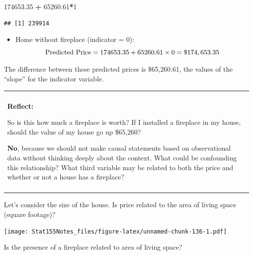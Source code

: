 \documentclass[]{book}
\newenvironment{Shaded}{\begin{snugshade}}{\end{snugshade}}
\newcommand{\DataTypeTok}[1]{\textcolor[rgb]{0.13,0.29,0.53}{#1}}
\newcommand{\DecValTok}[1]{\textcolor[rgb]{0.00,0.00,0.81}{#1}}
\newcommand{\FloatTok}[1]{\textcolor[rgb]{0.00,0.00,0.81}{#1}}
\newcommand{\KeywordTok}[1]{\textcolor[rgb]{0.13,0.29,0.53}{\textbf{#1}}}
\newcommand{\NormalTok}[1]{#1}
\newcommand{\OperatorTok}[1]{\textcolor[rgb]{0.81,0.36,0.00}{\textbf{#1}}}
\newcommand{\StringTok}[1]{\textcolor[rgb]{0.31,0.60,0.02}{#1}}
\providecommand{\tightlist}{%
  \setlength{\itemsep}{0pt}\setlength{\parskip}{0pt}}
\newenvironment{reflect}
{
    \begin{center}
    
    \begin{tabular}{|p{0.8\textwidth}|}
    \rowcolor{LightBlue}
    \hline\\
    \rowcolor{LightBlue}
    \textbf{Reflect:}
}
{
    \\\rowcolor{LightBlue}
    \\\hline
    \end{tabular} 
    \end{center}
}
\begin{document}
\begin{Shaded}
\begin{Highlighting}[]
\FloatTok{174653.35} \OperatorTok{+}\StringTok{ }\FloatTok{65260.61}\OperatorTok{*}\DecValTok{1}
\end{Highlighting}
\end{Shaded}

\begin{verbatim}
## [1] 239914
\end{verbatim}

\begin{itemize}
\tightlist
\item
  Home without fireplace (indicator = 0):\\
  \[ \hbox{Predicted Price} = 174653.35 + 65260.61 \times 0 = \$ 174,653.35 \]
\end{itemize}

The difference between these predicted prices is \$65,260.61, the values of the ``slope'' for the indicator variable.

\begin{reflect}
So is this how much a fireplace is worth? If I installed a fireplace in
my house, should the value of my house go up \$65,260?

\textbf{No}, because we should not make causal statements based on
observational data without thinking deeply about the context. What could
be confounding this relationship? What third variable may be related to
both the price and whether or not a house has a fireplace?
\end{reflect}

Let's consider the size of the house. Is price related to the area of living space (square footage)?

\begin{Shaded}
\end{Shaded}

\texttt{[image: Stat155Notes\_files/figure-latex/unnamed-chunk-136-1.pdf]}

Is the presence of a fireplace related to area of living space?
\end{document}
